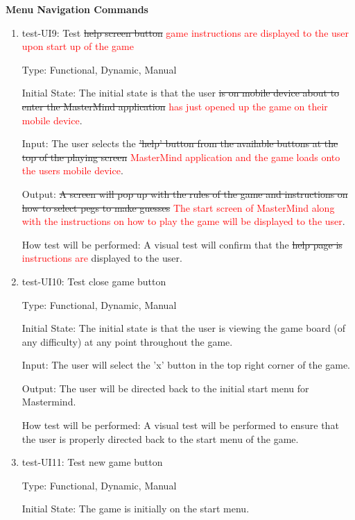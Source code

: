 \documentclass[12pt, titlepage]{article}
\begin{document}
\textbf{Menu Navigation Commands}\\
\begin{enumerate}

\item{test-UI9: Test \sout{help screen button} \textcolor{red}{game instructions are displayed to the user upon start up of the game}\\}

Type: Functional, Dynamic, Manual
					
Initial State: The initial state is that the user \sout{is on mobile device about to enter the MasterMind application} \textcolor{red}{has just opened up the game on their mobile device}.
					
Input: The user selects the \sout{'help' button from the available buttons at the top of the playing screen} \textcolor{red}{MasterMind application and the game loads onto the users mobile device}.
					
Output: \sout{A screen will pop up with the rules of the game and instructions on how to select pegs to make guesses} \textcolor{red}{The start screen of MasterMind along with the instructions on how to play the game will be displayed to the user}.
					
How test will be performed: A visual test will confirm that the \sout{help page is} \textcolor{red}{instructions are} displayed to the user.

\item{test-UI10: Test close game button\\}

Type: Functional, Dynamic, Manual
					
Initial State: The initial state is that the user is viewing the game board (of any difficulty) at any point throughout the game.
					
Input: The user will select the 'x' button in the top right corner of the game.
					
Output: The user will be directed back to the initial start menu for Mastermind. 
					
How test will be performed: A visual test will be performed to ensure that the user is properly directed back to the start menu of the game.

\item{test-UI11: Test new game button\\}

Type: Functional, Dynamic, Manual
					
Initial State: The game is initially on the start menu.
					

\end{enumerate}
\end{document}
